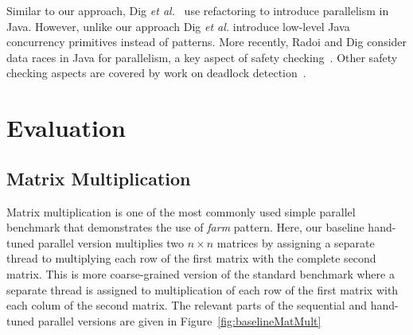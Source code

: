 Similar to our approach, Dig \textit{et al.}~\cite{dig} use refactoring to introduce parallelism in Java. However, unlike our approach Dig \textit{et al.} introduce low-level Java concurrency primitives instead of patterns. More recently,  Radoi and Dig consider data races in Java for parallelism, a key aspect of safety checking~\cite{DBLP:journals/tosem/RadoiD15}. Other safety checking aspects are covered by work on deadlock detection~\cite{DBLP:journals/tse/Corbett96}.


\section{Evaluation}

\subsection{Matrix Multiplication}
\noindent Matrix multiplication is one of the most commonly used simple parallel benchmark that demonstrates the use of \emph{farm} pattern. Here, our baseline hand-tuned parallel version multiplies two $n \times n$ matrices by assigning a separate thread to multiplying each row of the first matrix with the complete second matrix. This is more coarse-grained version of the standard benchmark where a separate thread is assigned to multiplication of each row of the first matrix with each colum of the second matrix. The relevant parts of the sequential and hand-tuned parallel versions are given in Figure~\ref{fig:baselineMatMult}

